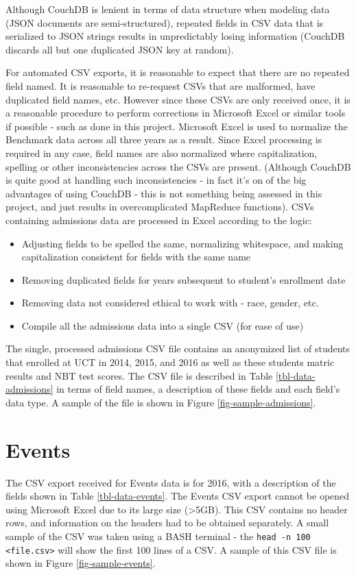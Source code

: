 Although CouchDB is lenient in terms of data structure when modeling data (JSON documents are semi-structured), repeated fields in CSV data that is serialized to JSON strings results in unpredictably losing information (CouchDB discards all but one duplicated JSON key at random).

For automated CSV exports, it is reasonable to expect that there are no repeated field named. It is reasonable to re-request CSVs that are malformed, have duplicated field names, etc. However since these CSVs are only received once, it is a reasonable procedure to perform corrections in Microsoft Excel or similar tools if possible - such as done in this project. Microsoft Excel is used to normalize the Benchmark data across all three years as a result. Since Excel processing is required in any case, field names are also normalized where capitalization, spelling or other inconsistencies across the CSVs are present. (Although CouchDB is quite good at handling such inconsistencies - in fact it's on of the big advantages of using CouchDB - this is not something being assessed in this project, and just results in overcomplicated MapReduce functions). CSVs containing admissions data are processed in Excel according to the logic:

\begin{itemize}
    \item Adjusting fields to be spelled the same, normalizing whitespace, and making capitalization consistent for fields with the same name
    \item Removing duplicated fields for years subsequent to student's enrollment date
    \item Removing data not considered ethical to work with - race, gender, etc.
    \item Compile all the admissions data into a single CSV (for ease of use)
\end{itemize}

The single, processed admissions CSV file contains an anonymized list of students that enrolled at UCT in 2014, 2015, and 2016 as well as these students matric results and NBT test scores. The CSV file is described in Table \ref{tbl-data-admissions} in terms of field names, a description of these fields and each field's data type. A sample of the file is shown in Figure \ref{fig-sample-admissions}.




\section{Events}
The CSV export received for Events data is for 2016, with a description of the fields shown in Table \ref{tbl-data-events}. The Events CSV export cannot be opened using Microsoft Excel due to its large size (\textgreater 5GB). This CSV contains no header rows, and information on the headers had to be obtained separately. A small sample of the CSV was taken using a BASH terminal - the \texttt{head -n 100 <file.csv>} will show the first 100 lines of a CSV. A sample of this CSV file is shown in Figure \ref{fig-sample-events}.


